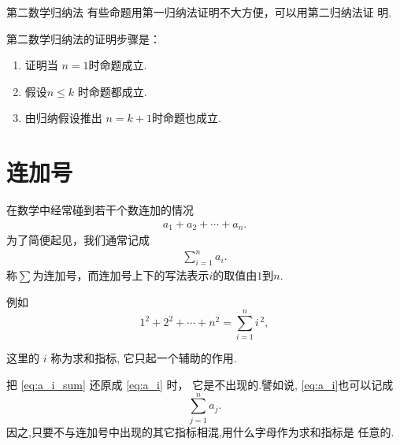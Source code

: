 \documentclass[11pt,punct]{ctexbeamer}
\newtheorem{ex}{例}
\begin{document}

\begin{frame}{第二数学归纳法}
有些命题用第一归纳法证明不大方便，可以用第二归纳法证
明.

第二数学归纳法的证明步骤是：
\begin{enumerate}
\item 证明当 $n=1$时命题成立.
\item 假设$n\le k$ 时命题都成立.
\item 由归纳假设推出 $n=k+1$时命题也成立.
\end{enumerate}

\end{frame}






\section{连加号}

\begin{frame}
		\small{
	在数学中经常碰到若干个数连加的情况
	\begin{align}\label{eq:a_i}
		a_1+a_2+\cdots+a_n.
	\end{align}
	为了简便起见，我们通常记成
	\begin{align}\label{eq:a_i_sum}
		\sum_{i=1}^{n}a_i.
	\end{align}
	称$\sum$为\alert{连加号}，而连加号上下的写法表示$i$的取值由$1$到$n$.

	例如
	\[1^2+2^2+\cdots+n^2=\sum_{i=1}^{n}i^{\, 2},\]

	这里的 $i$ 称为\alert{求和指标}, 它只起一个辅助的作用.

	把 \eqref{eq:a_i_sum} 还原成 \eqref{eq:a_i} 时，
	它是不出现的.譬如说, \eqref{eq:a_i}也可以记成
	$$
	\sum_{j=1}^{n} a_{j}.
	$$
因之,只要不与连加号中出现的其它指标相混,用什么字母作为求和指标是
	任意的.}
\end{frame}
\end{document}
